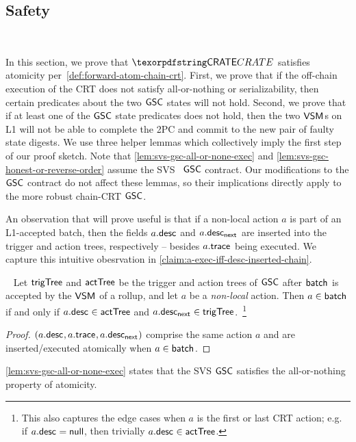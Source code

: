 \subsection{Safety}~\label{sec:safety-chain-crt}


In this section, we prove that $\pname$ satisfies atomicity per~\cref{def:forward-atom-chain-crt}. First, we prove that if the off-chain execution of the CRT does not satisfy all-or-nothing or serializability, then certain predicates about the two $\mathsf{GSC}$ states will not hold. Second, we prove that if at least one of the $\mathsf{GSC}$ state predicates does not hold, then the two $\mathsf{VSM}_{}$s on L1 will not be able to complete the 2PC and commit to the new pair of faulty state digests. We use three helper lemmas which collectively imply the first step of our proof sketch. Note that \cref{lem:svs-gsc-all-or-none-exec} and \cref{lem:svs-gsc-honest-or-reverse-order} assume the SVS~\cite{shared-val-seq-23} $\mathsf{GSC}$ contract. Our modifications to the $\mathsf{GSC}$ contract do not affect these lemmas, so their implications directly apply to the more robust chain-CRT $\mathsf{GSC}$. 






 An observation that will prove useful is that if a non-local action $a$ is part of an L1-accepted batch, then the fields $a.\mathsf{desc}_{}$ and $a.\mathsf{desc_{next}}_{}$ are inserted into the trigger and action trees, respectively -- besides $a.\mathsf{trace}_{}$ being executed. We capture this intuitive obesrvation in \cref{claim:a-exec-iff-desc-inserted-chain}. 
 
\begin{claim}~\label{claim:a-exec-iff-desc-inserted-chain}
    Let $\mathsf{trigTree}$ and $\mathsf{actTree}$ be the trigger and action trees of $\mathsf{GSC}$ after $\mathsf{batch}_{}$ is accepted by the $\mathsf{VSM}_{}$ of a rollup, and let $a$ be a \emph{non-local} action. Then $a \in \mathsf{batch}_{}$ if and only if $a.\mathsf{desc}_{} \in \mathsf{actTree}$ and $a.\mathsf{desc_{next}}_{} \in \mathsf{trigTree}$.~\footnote{This also captures the edge cases when $a$ is the first or last CRT action; e.g. if $a.\mathsf{desc}_{} = \mathsf{null}$, then trivially $a.\mathsf{desc}_{} \in \mathsf{actTree}$.}
\end{claim}

\begin{proof}
     $(a.\mathsf{desc}_{}, a.\mathsf{trace}_{}, a.\mathsf{desc_{next}}_{})$ comprise the same action $a$ and are inserted/executed atomically when $a \in \mathsf{batch}_{}$.
\end{proof}


\cref{lem:svs-gsc-all-or-none-exec} states that the SVS $\mathsf{GSC}$ satisfies the all-or-nothing property of atomicity.

